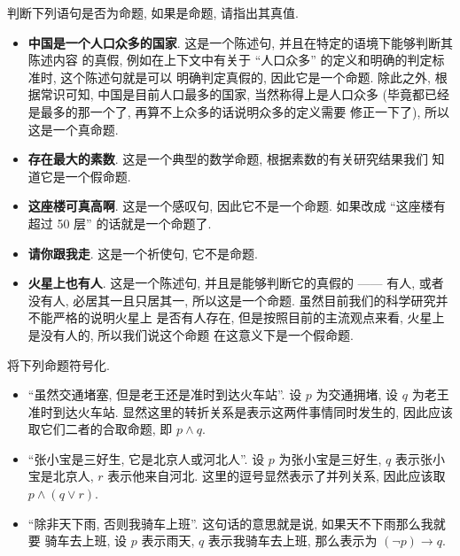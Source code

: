 \documentclass[10pt,UTF8]{ctexbook} %
\begin{document}
\begin{exercise}
    判断下列语句是否为命题, 如果是命题, 请指出其真值.
    \begin{itemize}[itemsep=0pt]
        \item \textbf{中国是一个人口众多的国家}. 这是一个陈述句, 并且在特定的语境下能够判断其陈述内容
        的真假, 例如在上下文中有关于 “人口众多” 的定义和明确的判定标准时, 这个陈述句就是可以
        明确判定真假的, 因此它是一个命题. 除此之外, 根据常识可知, 中国是目前人口最多的国家,
        当然称得上是人口众多 (毕竟都已经是最多的那一个了, 再算不上众多的话说明众多的定义需要
        修正一下了), 所以这是一个真命题.
        \item \textbf{存在最大的素数}. 这是一个典型的数学命题, 根据素数的有关研究结果我们
        知道它是一个假命题.
        \item \textbf{这座楼可真高啊}. 这是一个感叹句, 因此它不是一个命题. 如果改成 “这座楼有
        超过 50 层” 的话就是一个命题了.
        \item \textbf{请你跟我走}. 这是一个祈使句, 它不是命题.
        \item \textbf{火星上也有人}. 这是一个陈述句, 并且是能够判断它的真假的 —— 有人, 或者没有人,
        必居其一且只居其一, 所以这是一个命题. 虽然目前我们的科学研究并不能严格的说明火星上
        是否有人存在, 但是按照目前的主流观点来看, 火星上是没有人的, 所以我们说这个命题
        在这意义下是一个假命题.
    \end{itemize}
\end{exercise}

\begin{exercise}
    将下列命题符号化.
    \begin{itemize}[itemsep=0pt]
        \item “虽然交通堵塞, 但是老王还是准时到达火车站”. 设 $p$ 为交通拥堵,
        设 $q$ 为老王准时到达火车站. 显然这里的转折关系是表示这两件事情同时发生的,
        因此应该取它们二者的合取命题, 即 $p \wedge q$.
        \item “张小宝是三好生, 它是北京人或河北人”. 设 $p$ 为张小宝是三好生,
        $q$ 表示张小宝是北京人, $r$ 表示他来自河北. 这里的逗号显然表示了并列关系,
        因此应该取 $p \wedge (q \vee r)$.
        \item “除非天下雨, 否则我骑车上班”. 这句话的意思就是说, 如果天不下雨那么我就要
        骑车去上班, 设 $p$ 表示雨天, $q$ 表示我骑车去上班, 那么表示为
        $(\lnot p) \longrightarrow q$.
    \end{itemize}
\end{exercise}
\end{document}
